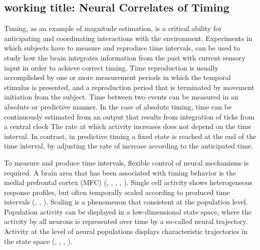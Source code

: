 \documentclass[10pt]{article}
\begin{document}
\subsection{working title: Neural Correlates of Timing}
Timing, as an example of magnitude estimation, is a critical ability for anticipating and coordinating interactions with the environment. 
Experiments in which subjects have to measure and reproduce time intervals, can be used to study how the brain integrates information from the past with current sensory input in order to achieve correct timing.
Time reproduction is usually accomplished by one or more measurement periods in which the temporal stimulus is presented, and a reproduction period that is terminated by movement initiation from the subject.
Time between two events can be measured in an absolute or predictive manner. In the case of absolute timing, time can be continuously estimated from an output that results from integration of ticks from a central clock  The rate at which activity increases does not depend on the time interval. In contrast, in predictive timing a fixed state is reached at the end of the time interval, by adjusting the rate of increase according to the anticipated time. 

To measure and produce time intervals, flexible control of neural mechanisms is required. 
A brain area that has been associated with timing behavior is the medial prefrontal cortex (MFC) (\cite{Wang2018}, \cite{Emmons2017}, \cite{Genovesio2006}, \cite{Lewis2004}, \cite{Shima2000}).
Single cell activity shows heterogeneous response profiles, but often temporally scaled according to produced time intervals (\cite{Henke2021}, \cite{Sohn2019}, \cite{Wang2018}).
Scaling is a phenomenon that consistent at the population level. Population activity can be displayed in a low-dimensional state space, where the activity by all neurons is represented over time by a so-called neural trajectory.
Activity at the level of neural populations displays characteristic trajectories in the state space (\cite{Henke2021}, \cite{Meirhaeghe2021}, \cite{Sohn2019}, \cite{Wang2018}). 
\end{document}
